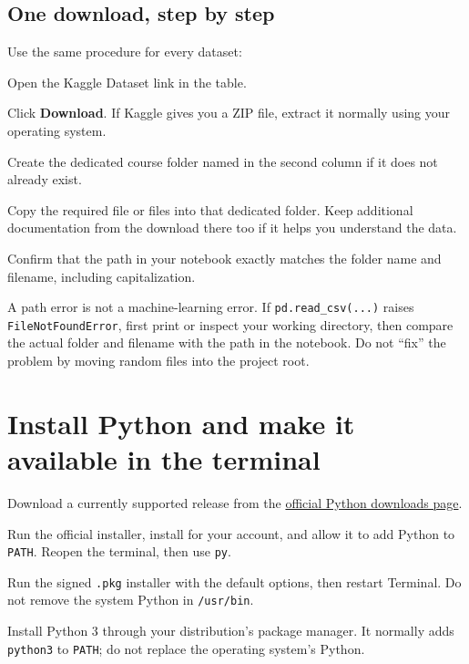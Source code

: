 \subsection{One download, step by step}

Use the same procedure for every dataset:

\begin{mlsteps}
  \item Open the Kaggle Dataset link in the table.
  \item Click \textbf{Download}. If Kaggle gives you a ZIP file, extract it normally using your operating system.
  \item Create the dedicated course folder named in the second column if it does not already exist.
  \item Copy the required file or files into that dedicated folder. Keep additional documentation from the download there too if it helps you understand the data.
  \item Confirm that the path in your notebook exactly matches the folder name and filename, including capitalization.
\end{mlsteps}

\begin{pitfall}
A path error is not a machine-learning error. If \texttt{pd.read\_csv(...)} raises \texttt{FileNotFoundError}, first print or inspect your working directory, then compare the actual folder and filename with the path in the notebook. Do not ``fix'' the problem by moving random files into the project root.
\end{pitfall}

\section{Install Python and make it available in the terminal}

Download a currently supported release from the \href{https://www.python.org/downloads/}{official Python downloads page}.

\begin{description}[leftmargin=1.15in,style=nextline]
  \item[Windows] Run the official installer, install for your account, and allow it to add Python to \texttt{PATH}. Reopen the terminal, then use \texttt{py}.
  \item[macOS] Run the signed \texttt{.pkg} installer with the default options, then restart Terminal. Do not remove the system Python in \texttt{/usr/bin}.
  \item[Linux] Install Python 3 through your distribution's package manager. It normally adds \texttt{python3} to \texttt{PATH}; do not replace the operating system's Python.
\end{description}


